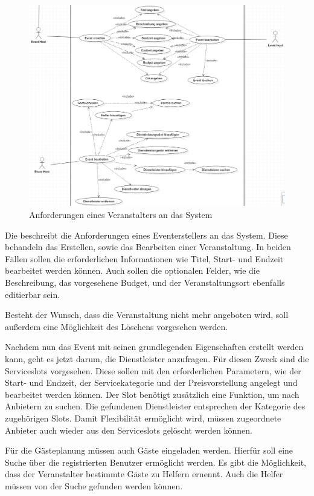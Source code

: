 \begin{figure}[ht]
\centering
\includegraphics[width=\textwidth]{res/images/UseCaseEventHost.png}
\caption{Anforderungen eines Veranstalters an das System}
\label{uc2}
\end{figure}

Die  beschreibt die Anforderungen eines Event\-erstellers an das System. Diese behandeln das Erstellen, sowie das Bearbeiten einer Veranstaltung. In beiden Fällen sollen die erforderlichen Informationen wie Titel, Start- und Endzeit bearbeitet werden können. Auch sollen die optionalen Felder, wie die Beschreibung, das vorgesehene Budget, und der Veranstaltungsort ebenfalls editierbar sein.

Besteht der Wunsch, dass die Veranstaltung nicht mehr angeboten wird, soll außerdem eine Möglichkeit des Löschens vorgesehen werden.

Nachdem nun das Event mit seinen grundlegenden Eigenschaften erstellt werden kann, geht es jetzt darum, die Dienstleister anzufragen. Für diesen Zweck sind die Serviceslots vorgesehen. Diese sollen mit den erforderlichen Parametern, wie der Start- und Endzeit, der Servicekategorie und der Preisvorstellung angelegt und bearbeitet werden können. Der Slot benötigt zusätzlich eine Funktion, um nach Anbietern zu suchen. Die gefundenen Dienstleister entsprechen der Kategorie des zugehörigen Slots. Damit Flexibilität ermöglicht wird, müssen zugeordnete Anbieter auch wieder aus den Serviceslots gelöscht werden können.

Für die Gästeplanung müssen auch Gäste eingeladen werden. Hierfür soll eine Suche über die registrierten Benutzer ermöglicht werden. Es gibt die Möglichkeit, dass der Veranstalter bestimmte Gäste zu Helfern ernennt. Auch die Helfer müssen von der Suche gefunden werden können.

